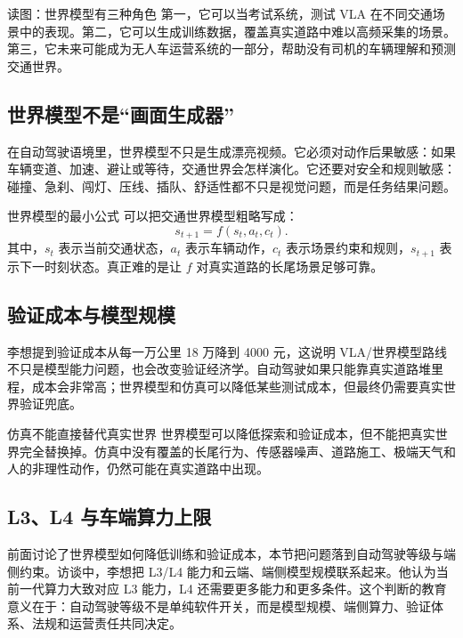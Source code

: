 \documentclass[a4paper]{article}
\begin{document}
\begin{knowledgebox}{读图：世界模型有三种角色}
第一，它可以当考试系统，测试 VLA 在不同交通场景中的表现。第二，它可以生成训练数据，覆盖真实道路中难以高频采集的场景。第三，它未来可能成为无人车运营系统的一部分，帮助没有司机的车辆理解和预测交通世界。
\end{knowledgebox}

\subsection{世界模型不是“画面生成器”}

在自动驾驶语境里，世界模型不只是生成漂亮视频。它必须对动作后果敏感：如果车辆变道、加速、避让或等待，交通世界会怎样演化。它还要对安全和规则敏感：碰撞、急刹、闯灯、压线、插队、舒适性都不只是视觉问题，而是任务结果问题。

\begin{importantbox}{世界模型的最小公式}
可以把交通世界模型粗略写成：
\[
s_{t+1} = f(s_t, a_t, c_t).
\]
其中，\(s_t\) 表示当前交通状态，\(a_t\) 表示车辆动作，\(c_t\) 表示场景约束和规则，\(s_{t+1}\) 表示下一时刻状态。真正难的是让 \(f\) 对真实道路的长尾场景足够可靠。
\end{importantbox}

\subsection{验证成本与模型规模}

李想提到验证成本从每一万公里 18 万降到 4000 元，这说明 VLA/世界模型路线不只是模型能力问题，也会改变验证经济学。自动驾驶如果只能靠真实道路堆里程，成本会非常高；世界模型和仿真可以降低某些测试成本，但最终仍需要真实世界验证兜底。

\begin{warningbox}{仿真不能直接替代真实世界}
世界模型可以降低探索和验证成本，但不能把真实世界完全替换掉。仿真中没有覆盖的长尾行为、传感器噪声、道路施工、极端天气和人的非理性动作，仍然可能在真实道路中出现。
\end{warningbox}

\subsection{L3、L4 与车端算力上限}

前面讨论了世界模型如何降低训练和验证成本，本节把问题落到自动驾驶等级与端侧约束。访谈中，李想把 L3/L4 能力和云端、端侧模型规模联系起来。他认为当前一代算力大致对应 L3 能力，L4 还需要更多能力和更多条件。这个判断的教育意义在于：自动驾驶等级不是单纯软件开关，而是模型规模、端侧算力、验证体系、法规和运营责任共同决定。
\end{document}
